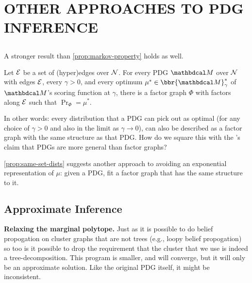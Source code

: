 \documentclass[twoside]{article}
\begin{document}
\section{OTHER APPROACHES TO PDG INFERENCE} \label{sec:other-inference}

\subsection{}
A stronger result than \cref{prop:markov-property} holds as well.
\begin{prop}\label{prop:same-set-dists}
    Let $\mathcal E$ be a set of (hyper)edges over $\mathcal N$. 
    For every PDG $\dg M$ over $\mathcal N$ with edges $\mathcal E$, every $\gamma > 0$, and every optimum $\mu^* \in \bbr{\dg M}_\gamma^*$ of $\dg M$'s scoring function at $\gamma$, 
    there is a factor graph $\Phi$ with factors along $\mathcal E$ such that $\Pr_\Phi = \mu^*$. 
\end{prop}

In other words: every distribution that a PDG can pick out as optimal (for any choice of $\gamma > 0$ and also in the limit as $\gamma \to 0$), can also be described as a factor graph with the same structure as that PDG.
How do we square this with the \citeauthor{pdg-aaai}'s claim that PDGs are more general than factor graphs?



\cref{prop:same-set-dists} suggests another approach to avoiding an exponential representation of $\mu$: given a PDG, fit a factor graph that has the same structure to it. 

\subsection{Approximate Inference}
\textbf{Relaxing the marginal polytope.}
Just as it is possible to do belief propogation on cluster graphs that are not trees (e.g., loopy belief propogation)
so too is it possible to drop the requirement that the cluster that we use is indeed a tree-decomposition.
This program is smaller, and will converge, but it will only be an approximate solution. 
Like the original PDG itself, it might be inconsistent. 
\end{document}
